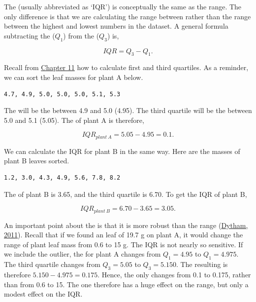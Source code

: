 \documentclass[
  openany]{krantz}
\begin{document}
The  (usually abbreviated as `IQR') is conceptually the same as the range.
The only difference is that we are calculating the range between  rather than the range between the highest and lowest numbers in the dataset.
A general formula subtracting the  (\(Q_{1}\)) from the  (\(Q_{3}\)) is,

\[IQR = Q_{3} - Q_{1}.\]

Recall from \protect\hyperlink{Chapter_11}{Chapter 11} how to calculate first and third quartiles.
As a reminder, we can sort the leaf masses for plant A below.

\begin{verbatim}
4.7, 4.9, 5.0, 5.0, 5.0, 5.1, 5.3
\end{verbatim}

The  will be the  between 4.9 and 5.0 (4.95).
The third quartile will be the  between 5.0 and 5.1 (5.05).
The  of plant A is therefore,

\[IQR_{plant\:A} = 5.05 - 4.95 = 0.1.\]

We can calculate the IQR for plant B in the same way.
Here are the masses of plant B leaves sorted.

\begin{verbatim}
1.2, 3.0, 4.3, 4.9, 5.6, 7.8, 8.2
\end{verbatim}

The  of plant B is 3.65, and the third quartile is 6.70.
To get the IQR of plant B,

\[IQR_{plant\:B} = 6.70 - 3.65 = 3.05.\]

An important point about the  is that it is more robust than the range (\protect\hyperlink{ref-Dytham2011}{Dytham, 2011}).
Recall that if we found an  leaf of 19.7 g on plant A, it would change the range of plant leaf mass from 0.6 to 15 g.
The IQR is not nearly so sensitive.
If we include the outlier, the  for plant A changes from \(Q_{1} = 4.95\) to \(Q_{1} = 4.975\).
The third quartile changes from \(Q_{3} = 5.05\) to \(Q_{3} = 5.150\).
The resulting  is therefore \(5.150 - 4.975 = 0.175\).
Hence, the  only changes from 0.1 to 0.175, rather than from 0.6 to 15.
The one  therefore has a huge effect on the range, but only a modest effect on the IQR.
\end{document}
